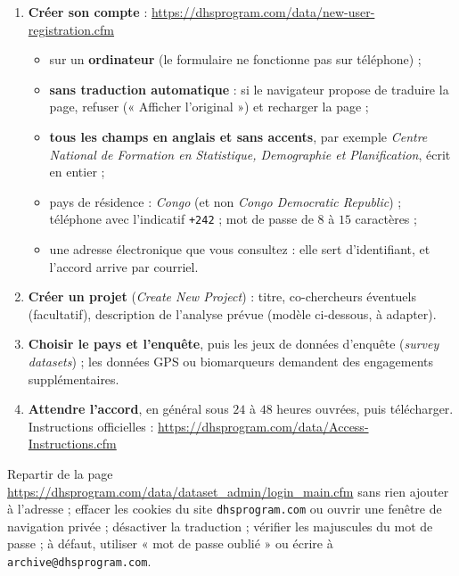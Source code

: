 \documentclass[11pt]{article}
\begin{document}
\begin{enumerate}
  \item \textbf{Créer son compte} : \url{https://dhsprogram.com/data/new-user-registration.cfm}
        \begin{itemize}
          \item sur un \textbf{ordinateur} (le formulaire ne fonctionne pas sur téléphone) ;
          \item \textbf{sans traduction automatique} : si le navigateur propose de traduire la page, refuser (« Afficher l'original ») et recharger la page ;
          \item \textbf{tous les champs en anglais et sans accents}, par exemple \emph{Centre National de Formation en Statistique, Demographie et Planification}, écrit en entier ;
          \item pays de résidence : \emph{Congo} (et non \emph{Congo Democratic Republic}) ; téléphone avec l'indicatif \texttt{+242} ; mot de passe de $8$ à $15$ caractères ;
          \item une adresse électronique que vous consultez : elle sert d'identifiant, et l'accord arrive par courriel.
        \end{itemize}
  \item \textbf{Créer un projet} (\emph{Create New Project}) : titre, co-chercheurs éventuels (facultatif), description de l'analyse prévue (modèle ci-dessous, à adapter).
  \item \textbf{Choisir le pays et l'enquête}, puis les jeux de données d'enquête (\emph{survey datasets}) ; les données GPS ou biomarqueurs demandent des engagements supplémentaires.
  \item \textbf{Attendre l'accord}, en général sous $24$ à $48$ heures ouvrées, puis télécharger. Instructions officielles : \url{https://dhsprogram.com/data/Access-Instructions.cfm}
\end{enumerate}

\begin{remarque}
Repartir de la page \url{https://dhsprogram.com/data/dataset_admin/login_main.cfm} sans rien ajouter à l'adresse ; effacer les cookies du site \texttt{dhsprogram.com} ou ouvrir une fenêtre de navigation privée ; désactiver la traduction ; vérifier les majuscules du mot de passe ; à défaut, utiliser « mot de passe oublié » ou écrire à \texttt{archive@dhsprogram.com}.
\end{remarque}
\end{document}

